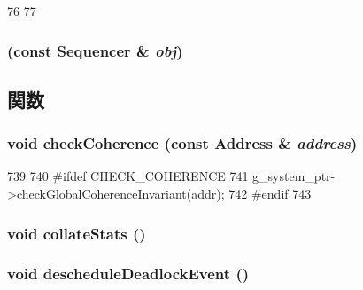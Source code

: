 \begin{DoxyCode}
76 {
77 }
\end{DoxyCode}
\hypertarget{classSequencer_a59cf565c114ce83354332f4f49b9add0}{
\subsubsection[{Sequencer}]{ (const {\bf Sequencer} \& {\em obj})}}
\label{classSequencer_a59cf565c114ce83354332f4f49b9add0}


\subsection{関数}
\hypertarget{classSequencer_a381b1e1191b76356f0a37f22b3d19c52}{
\subsubsection[{checkCoherence}]{\setlength{\rightskip}{0pt plus 5cm}void checkCoherence (const {\bf Address} \& {\em address})}}
\label{classSequencer_a381b1e1191b76356f0a37f22b3d19c52}



\begin{DoxyCode}
739 {
740 #ifdef CHECK_COHERENCE
741     g_system_ptr->checkGlobalCoherenceInvariant(addr);
742 #endif
743 }
\end{DoxyCode}
\hypertarget{classSequencer_a208669cbc0bb1d52565956ca8c690c55}{
\subsubsection[{collateStats}]{\setlength{\rightskip}{0pt plus 5cm}void collateStats ()}}
\label{classSequencer_a208669cbc0bb1d52565956ca8c690c55}
\hypertarget{classSequencer_a7c9a8861621a62055761f47310814762}{
\subsubsection[{descheduleDeadlockEvent}]{\setlength{\rightskip}{0pt plus 5cm}void descheduleDeadlockEvent ()}}
\label{classSequencer_a7c9a8861621a62055761f47310814762}



